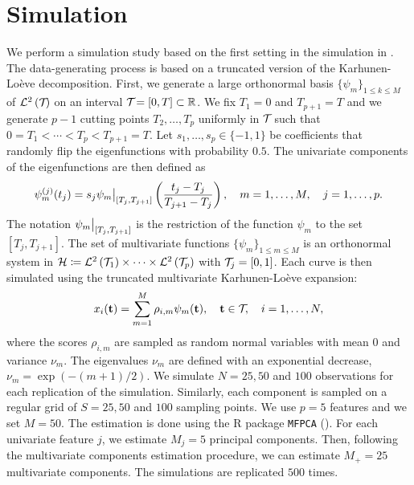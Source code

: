 
\section{Simulation} %
\label{sec:simulation}

We perform a simulation study based on the first setting in the simulation in \cite{happMultivariateFunctionalPrincipal2018}. The data-generating process is based on a truncated version of the Karhunen-Loève decomposition. First, we generate a large orthonormal basis $\{\psi_m\}_{1 \leq k \leq M}$ of $\mathcal{L}^{2}\left(\mathcal{T}_{}\right)$ on an interval $\mathcal{T}_{} = [0, T] \subset \mathbb{R}$. We fix $T_1 = 0$ and $T_{p + 1} = T$ and we generate $p - 1$ cutting points $T_2, \dots, T_p$ uniformly in $\mathcal{T}_{}$ such that $0 = T_1 < \cdots < T_p < T_{p+1} = T$. Let $s_1, \dots, s_p \in \{-1, 1\}$ be coefficients that randomly flip the eigenfunctions with probability $0.5$. The univariate components of the eigenfunctions are then defined as
\begin{equation}\label{eq:simulation_uni_component}
    \psi_m^{(j)}(t_j) = s_j \restr{\psi_m}{[T_j, T_{j + 1}]}\left(\frac{t_j - T_j}{T_{j + 1} - T_j}\right), \quad m = 1, \dots, M, \quad j = 1, \dots, p.
\end{equation}
The notation $\restr{\psi_m}{[T_j, T_{j + 1}]}$ is the restriction of the function $\psi_m$ to the set $[T_j, T_{j + 1}]$. The set of multivariate functions $\{\psi_m\}_{1 \leq m \leq M}$ is an orthonormal system in $\mathcal{H} \coloneqq \mathcal{L}^{2}\left(\mathcal{T}_{1}\right) \times \dots \times \mathcal{L}^{2}\left(\mathcal{T}_{p}\right)$ with $\mathcal{T}_{j} = [0, 1]$. Each curve is then simulated using the truncated multivariate Karhunen-Loève expansion:
\begin{equation}
    x_i(\mathbf{t}) = \sum_{m = 1}^M \rho_{i, m} \psi_m(\mathbf{t}), \quad \mathbf{t} \in \mathcal{T}_{},\quad i = 1, \dots, N,
\end{equation}
where the scores $\rho_{i, m}$ are sampled as random normal variables with mean $0$ and variance $\nu_m$. The eigenvalues $\nu_m$ are defined with an exponential decrease, $\nu_m = \exp(-(m + 1)/2)$. We simulate $N = 25, 50$ and $100$ observations for each replication of the simulation. Similarly, each component is sampled on a regular grid of $S = 25, 50$ and $100$ sampling points. We use $p = 5$ features and we set $M = 50$. The estimation is done using the \textsf{R} package \texttt{MFPCA} (\cite{happ-kurzObjectOrientedSoftwareFunctional2020}). For each univariate feature $j$, we estimate $M_j = 5$ principal components. Then, following the multivariate components estimation procedure, we can estimate $M_+ = 25$ multivariate components. The simulations are replicated $500$ times.

